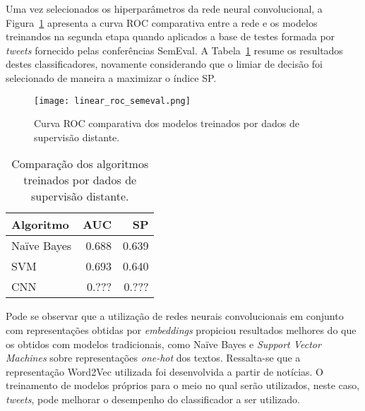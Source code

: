 Uma vez selecionados os hiperparâmetros da rede neural convolucional, a Figura~\ref{fig:all_roc_semeval} apresenta a
curva ROC comparativa entre a rede e os modelos treinandos na segunda etapa quando aplicados a base de testes formada
por \textit{tweets} fornecido pelas conferências SemEval.
A Tabela~\ref{tab:all_compara} resume os resultados destes classificadores, novamente considerando que o limiar de
decisão foi selecionado de maneira a maximizar o índice SP.

\begin{figure}
\begin{center} {
    \begin{center}
    \texttt{[image: linear\_roc\_semeval.png]}
    \caption{Curva ROC comparativa dos modelos treinados por dados de supervisão distante.}
    \label{fig:all_roc_semeval}
    \end{center}
}
\end{center}
\end{figure}

\begin{table}[h]
    \begin{center}
        \begin{tabular}{| l | r | r |}
        \hline
        \textbf{Algoritmo} & \textbf{AUC} & \textbf{SP} \\ \hline
        Naïve Bayes & 0.688 & 0.639 \\ \hline
        SVM & 0.693 & 0.640 \\ \hline
        CNN & 0.??? & 0.??? \\ \hline
        \end{tabular}
        \caption{Comparação dos algoritmos treinados por dados de supervisão distante.}
        \label{tab:all_compara}
    \end{center}
\end{table}

Pode se observar que a utilização de redes neurais convolucionais em conjunto com representações obtidas por
\textit{embeddings} propiciou resultados melhores do que os obtidos com modelos tradicionais, como Naïve Bayes e
\textit{Support Vector Machines} sobre representações \textit{one-hot} dos textos.
Ressalta-se que a representação Word2Vec utilizada foi desenvolvida a partir de notícias.
O treinamento de modelos próprios para o meio no qual serão utilizados, neste caso, \textit{tweets}, pode melhorar o
desempenho do classificador a ser utilizado.
